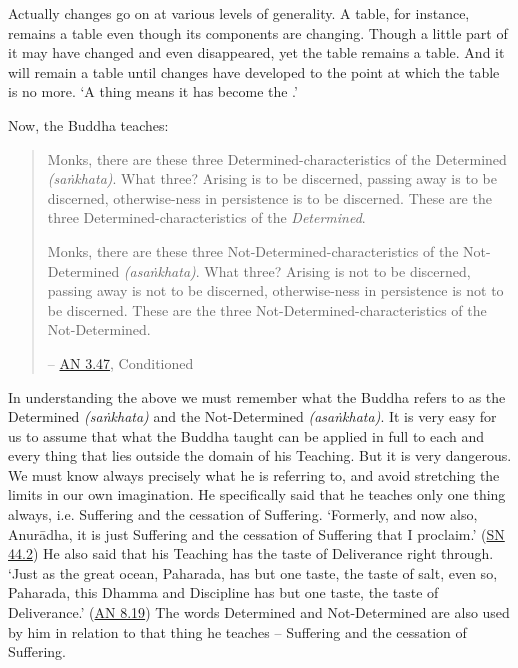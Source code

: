 Actually changes go on at various levels of generality. A table, for instance, remains a table even though its components are changing. Though a little part of it may have changed and even disappeared, yet the table remains a table. And it will remain a table until changes have developed to the point at which the table is no more. `A thing  means it has become the .'

Now, the Buddha teaches:

\begin{quote}
Monks, there are these three Determined-characteristics of the Determined \emph{(saṅkhata)}. What three? Arising is to be discerned, passing away is to be discerned, otherwise-ness in persistence is to be discerned. These are the three Determined-characteristics of the \emph{Determined}.

Monks, there are these three Not-Determined-characteristics of the Not-Determined \emph{(asaṅkhata)}. What three? Arising is not to be discerned, passing away is not to be discerned, otherwise-ness in persistence is not to be discerned. These are the three Not-Determined-characteristics of the Not-Determined.

 -- \href{https://suttacentral.net/an3.47/en/bodhi}{AN 3.47}, Conditioned
\end{quote}

In understanding the above we must remember what the Buddha refers to as the Determined \emph{(saṅkhata)} and the Not-Determined \emph{(asaṅkhata)}. It is very easy for us to assume that what the Buddha taught can be applied in full to each and every thing that lies outside the domain of his Teaching. But it is very dangerous. We must know always precisely what he is referring to, and avoid stretching the limits in our own imagination. He specifically said that he teaches only one thing always, i.e. Suffering and the cessation of Suffering. `Formerly, and now also, Anurādha, it is just Suffering and the cessation of Suffering that I proclaim.' (\href{https://suttacentral.net/sn44.2/en/sujato}{SN 44.2}) He also said that his Teaching has the taste of Deliverance right through. `Just as the great ocean, Paharada, has but one taste, the taste of salt, even so, Paharada, this Dhamma and Discipline has but one taste, the taste of Deliverance.' (\href{https://suttacentral.net/an8.19/en/bodhi}{AN 8.19}) The words Determined and Not-Determined are also used by him in relation to that  thing he teaches -- Suffering and the cessation of Suffering.

